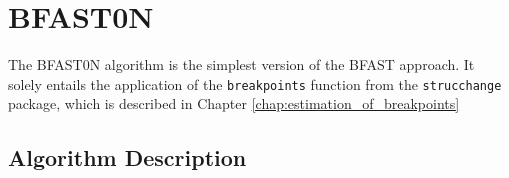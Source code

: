 \documentclass[main.tex]{subfiles}
\begin{document}
\chapter{BFAST0N}
\label{chap:bfast0n}
The BFAST0N algorithm is the simplest version of the BFAST approach. It solely entails
the application of the \texttt{breakpoints} function from the
\texttt{strucchange} package, which is described in Chapter \ref{chap:estimation_of_breakpoints}
\section{Algorithm Description}
\label{sec:bfast0n_desc}


\biblio
\end{document}
